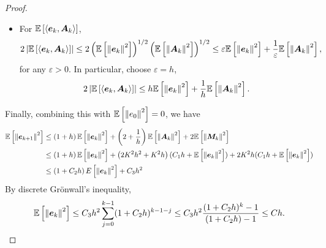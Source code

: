 \begin{proof}
\begin{itemize}
        \item For $\E\bj{\inn{\bm{e}_k,\bm{A}_k}}$,
        \begin{equation*}
            2\abs{\E\bj{\inn{\bm{e}_k,\bm{A}_k}}} \leq 2\bc{\E\bj{\norm{\bm{e}_k}^2}}^{1/2}\bc{\E\bj{\norm{\bm{A}_k}^2}}^{1/2} \leq \varepsilon\E\bj{\norm{\bm{e}_k}^2} +\frac{1}{\varepsilon} \E\bj{\norm{\bm{A}_k}^2},
        \end{equation*}
        for any $\varepsilon > 0$. In particular, choose $\varepsilon = h$,
        \begin{equation*}
            2\abs{\E\bj{\inn{\bm{e}_k,\bm{A}_k}}} \leq h\E\bj{\norm{\bm{e}_k}^2} +\frac{1}{h} \E\bj{\norm{\bm{A}_k}^2}.
        \end{equation*}
    \end{itemize}
    Finally, combining this with $\E\bj{\norm{e_0}^2} = 0$, we have
    \begin{align*}
        \E\bj{\norm{\bm{e}_{k+1}}^2} &\leq \bc{1 + h}\E\bj{\norm{\bm{e}_{k}}^2} + \bc{2 + \frac{1}{h}}\E\bj{\norm{\bm{A}_{k}}^2} + 2\E\bj{\norm{\bm{M}_{k}}^2} \\
        &\leq \bc{1 + h}\E\bj{\norm{\bm{e}_{k}}^2} + \bc{2K^2h^2 + K^2h}(C_1h + \E\bj{\norm{\bm{e}_k}^2}) + 2 K^2h(C_1h + \E\bj{\norm{\bm{e}_k}^2}) \\
        &\leq \bc{1 + C_2h}E\bj{\norm{\bm{e}_{k}}^2} + C_3h^2
    \end{align*}
    By discrete Gr\"onwall's inequality,
    \begin{equation*}
        \E\bj{\norm{\bm{e}_k}^2} \leq C_3h^2\sum_{j=0}^{k-1}(1+C_2h)^{k-1-j} \leq C_3h^2\frac{(1+C_2h)^k-1}{(1+C_2h)-1} \leq Ch. \qedhere
    \end{equation*}
\end{proof}
